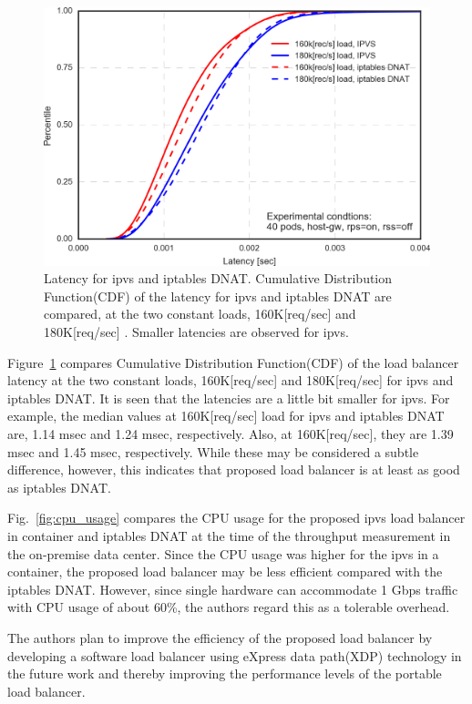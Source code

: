 \begin{figure}[h]
  \centering
  \includegraphics[width=0.75\columnwidth]{Figs/latency_cdf_rps_40pods}
  \par\bigskip
  \centering
  \begin{minipage}{0.9\columnwidth}
    \caption[Latency for ipvs and iptables DNAT]{
      Latency for ipvs and iptables DNAT.
      Cumulative Distribution Function(CDF) of the latency for ipvs and iptables DNAT are compared, at the two constant loads, 160K[req/sec] and 180K[req/sec] .
      Smaller latencies are observed for ipvs.
}
    \label{fig:latency_cdf_rps_40pods}
  \end{minipage}
\end{figure}

Figure~\ref{fig:latency_cdf_rps_40pods} compares Cumulative Distribution Function(CDF) of the load balancer latency at the two constant loads, 160K[req/sec] and 180K[req/sec] for ipvs and iptables DNAT.
It is seen that the latencies are a little bit smaller for ipvs.
For example, the median values at 160K[req/sec] load for ipvs and iptables DNAT are, 1.14 msec and 1.24 msec, respectively.
Also, at 160K[req/sec], they are 1.39 msec and 1.45 msec, respectively.
%
While these may be considered a subtle difference, however, this indicates that proposed load balancer is at least as good as iptables DNAT.

Fig.~\ref{fig:cpu_usage} compares the CPU usage for the proposed ipvs load balancer in container and iptables DNAT at the time of the throughput measurement in the on-premise data center.
Since the CPU usage was higher for the ipvs in a container, the proposed load balancer may be less efficient compared with the iptables DNAT.
However, since single hardware can accommodate 1 Gbps traffic with CPU usage of about 60\%, the authors regard this as a tolerable overhead.

The authors plan to improve the efficiency of the proposed load balancer by developing a software load balancer using eXpress data path(XDP) technology\cite{hoiland2018express} in the future work and thereby improving the performance levels of the portable load balancer.

